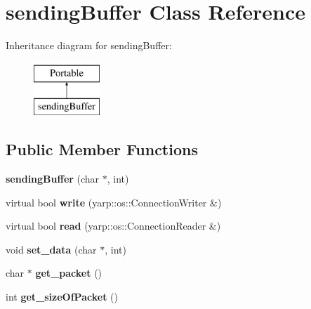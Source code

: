 \hypertarget{classsendingBuffer}{}\section{sending\+Buffer Class Reference}
\label{classsendingBuffer}
Inheritance diagram for sending\+Buffer\+:\begin{figure}[H]
\begin{center}
\leavevmode
\includegraphics[height=2.000000cm]{classsendingBuffer}
\end{center}
\end{figure}
\subsection*{Public Member Functions}
\begin{DoxyCompactItemize}
\item 
{\bfseries sending\+Buffer} (char $\ast$, int)\hypertarget{classsendingBuffer_ab4c1d25d2e85e15f48e06873097deaa2}{}\label{classsendingBuffer_ab4c1d25d2e85e15f48e06873097deaa2}

\item 
virtual bool {\bfseries write} (yarp\+::os\+::\+Connection\+Writer \&)\hypertarget{classsendingBuffer_a40b2e61a078ebe6ea507afd73728f82c}{}\label{classsendingBuffer_a40b2e61a078ebe6ea507afd73728f82c}

\item 
virtual bool {\bfseries read} (yarp\+::os\+::\+Connection\+Reader \&)\hypertarget{classsendingBuffer_ad148ea47f1ef7d56e522909c212ae552}{}\label{classsendingBuffer_ad148ea47f1ef7d56e522909c212ae552}

\item 
void {\bfseries set\+\_\+data} (char $\ast$, int)\hypertarget{classsendingBuffer_adf6ced8e177d52765bc8504af4aa0a45}{}\label{classsendingBuffer_adf6ced8e177d52765bc8504af4aa0a45}

\item 
char $\ast$ {\bfseries get\+\_\+packet} ()\hypertarget{classsendingBuffer_a81ead3fede32e415e1073f31d9bc2f43}{}\label{classsendingBuffer_a81ead3fede32e415e1073f31d9bc2f43}

\item 
int {\bfseries get\+\_\+size\+Of\+Packet} ()\hypertarget{classsendingBuffer_a76aaef5c8f64d644c04536a9dbb75de6}{}\label{classsendingBuffer_a76aaef5c8f64d644c04536a9dbb75de6}

\end{DoxyCompactItemize}



